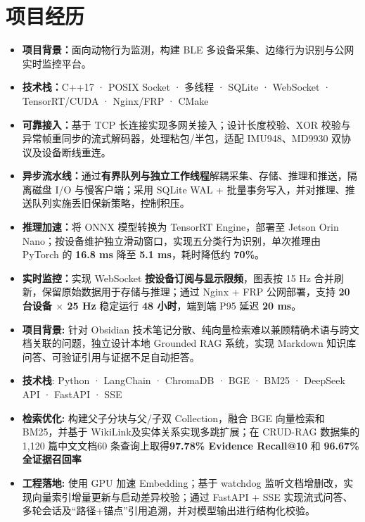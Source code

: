 \documentclass{resume}
\begin{document}
\section{项目经历}
\begin{itemize}
  \item \textbf{项目背景：}面向动物行为监测，构建 BLE 多设备采集、边缘行为识别与公网实时监控平台。
  \item \textbf{技术栈：}C++17 · POSIX Socket · 多线程 · SQLite · WebSocket · TensorRT/CUDA · Nginx/FRP · CMake
  \item \textbf{可靠接入：}基于 TCP 长连接实现多网关接入；设计长度校验、XOR 校验与异常帧重同步的流式解码器，处理粘包/半包，适配 IMU948、MD9930 双协议及设备断线重连。
  \item \textbf{异步流水线：}通过\textbf{有界队列与独立工作线程}解耦采集、存储、推理和推送，隔离磁盘 I/O 与慢客户端；采用 SQLite WAL + 批量事务写入，并对推理、推送队列实施丢旧保新策略，控制积压。
  \item \textbf{推理加速：}将 ONNX 模型转换为 TensorRT Engine，部署至 Jetson Orin Nano；按设备维护独立滑动窗口，实现五分类行为识别，单次推理由 PyTorch 的 \textbf{16.8 ms} 降至 \textbf{5.1 ms}，耗时降低约 \textbf{70\%}。
  \item \textbf{实时监控：}实现 WebSocket \textbf{按设备订阅与显示限频}，图表按 15 Hz 合并刷新，保留原始数据用于存储与推理；通过 Nginx + FRP 公网部署，支持 \textbf{20 台设备 $\times$ 25 Hz} 稳定运行 \textbf{48 小时}，端到端 P95 延迟 \textbf{20 ms}。
\end{itemize}

\begin{itemize}
  \item \textbf{项目背景:} 针对 Obsidian 技术笔记分散、纯向量检索难以兼顾精确术语与跨文档关联的问题，独立设计本地 Grounded RAG 系统，实现 Markdown 知识库问答、可验证引用与证据不足自动拒答。
  \item \textbf{技术栈}: Python · LangChain · ChromaDB · BGE · BM25 · DeepSeek API · FastAPI · SSE
  \item \textbf{检索优化:} 构建父子分块与父/子双 Collection，融合 BGE 向量检索和 BM25，并基于 WikiLink及实体关系实现多跳扩展；在 CRUD-RAG 数据集的 1,120 篇中文文档60 条查询上取得\textbf{97.78\% Evidence Recall@10} 和 \textbf{96.67\% 全证据召回率}
  \item \textbf{工程落地:} 使用 GPU 加速 Embedding；基于 watchdog 监听文档增删改，实现向量索引增量更新与启动差异校验；通过 FastAPI + SSE 实现流式问答、多轮会话及“路径+锚点”引用追溯，并对模型输出进行结构化校验。
\end{itemize}
\end{document}
